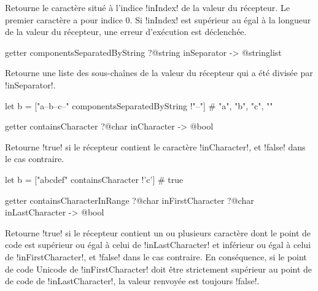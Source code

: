Retourne le caractère situé à l'indice \ggs!inIndex! de la valeur du récepteur. Le premier caractère a pour indice $0$. Si \ggs!inIndex! est supérieur au égal à la longueur de la valeur du récepteur, une erreur d'exécution est déclenchée.












\begin{galgasbox}
getter componentsSeparatedByString ?@string inSeparator -> @stringlist
\end{galgasbox}
Retourne une liste des sous-chaînes de la valeur du récepteur qui a été divisée par \ggs!inSeparator!.

\begin{galgas}
let b = ["a--b--c--" componentsSeparatedByString !"--"]
# "a", "b", "c", ""
\end{galgas}













\begin{galgasbox}
getter containsCharacter ?@char inCharacter -> @bool
\end{galgasbox}
Retourne \ggs!true! si le récepteur contient le caractère \ggs!inCharacter!, et \ggs!false! dans le cas contraire.

\begin{galgas}
let b = ["abcdef" containsCharacter !'c'] # true
\end{galgas}






\begin{galgasbox}
getter containsCharacterInRange
  ?@char inFirstCharacter
  ?@char inLastCharacter
  -> @bool
\end{galgasbox}

Retourne \ggs!true! si le récepteur contient un ou plusieurs caractère dont le point de code est supérieur ou égal à celui de \ggs!inLastCharacter! et inférieur ou égal à celui de \ggs!inFirstCharacter!, et \ggs!false! dans le cas contraire. En conséquence, si le point de code Unicode de \ggs!inFirstCharacter! doit être strictement supérieur au point de de code de \ggs!inLastCharacter!, la valeur renvoyée est toujours \ggs!false!.

